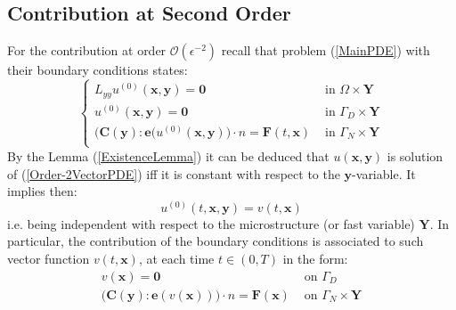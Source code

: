\subsection{Contribution at Second Order}
For the contribution at order $\mathcal{O}(\epsilon^{-2})$ recall that problem (\ref{MainPDE}) with their boundary conditions states:
\begin{equation}
    \label{Order-2VectorPDE}
    \left \{
    \begin{array}{cc}
        L_{yy} u^{(0)}( \mathbf{x},\mathbf{y}) = \mathbf{0} & \text{ in } \Omega \times \mathbf{Y}\\
        u^{(0)} (\mathbf{x},\mathbf{y}) = \mathbf{0} & \text{ in } \Gamma_D \times \mathbf{Y} \\
        \big( \mathbf{C}(\mathbf{y}) :\mathbf{e}(u^{(0)}(\mathbf{x},\mathbf{y}) \big) \cdot n = \mathbf{F}(t, \mathbf{x}) & \text{ in } \Gamma_N \times \mathbf{Y} \\
    \end{array}
    \right .
\end{equation}
By the Lemma (\ref{ExistenceLemma}) it can be deduced that $u(\mathbf{x},\mathbf{y})$ is solution of (\ref{Order-2VectorPDE}) iff it is constant with respect to the $\mathbf{y}$-variable. It implies then:
\begin{equation}
    \label{IndepencyofY}
    u^{(0)}(t, \mathbf{x},\mathbf{y}) = v(t, \mathbf{x})
\end{equation}
i.e. being independent with respect to the microstructure (or fast variable) $\mathbf{Y}$. In particular, the contribution of the boundary conditions is associated to such vector function $v(t, \mathbf{x})$, at each time $t \in (0,T)$ in the form:
\begin{equation*}
    \begin{array}{cc}
        v(\mathbf{x}) = \mathbf{0} & \text{ on } \Gamma_D\\
        \big(\mathbf{C}(\mathbf{y}):\mathbf{e}(v(\mathbf{x})) \big) \cdot n = \mathbf{F}(\mathbf{x}) & \text{ on } \Gamma_N \times \mathbf{Y}
    \end{array}
\end{equation*}

